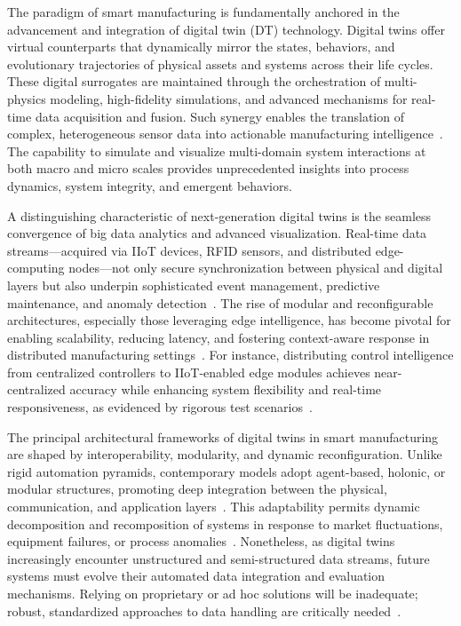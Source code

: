 \documentclass[sigconf]{acmart}
\begin{document}
The paradigm of smart manufacturing is fundamentally anchored in the advancement and integration of digital twin (DT) technology. Digital twins offer virtual counterparts that dynamically mirror the states, behaviors, and evolutionary trajectories of physical assets and systems across their life cycles. These digital surrogates are maintained through the orchestration of multi-physics modeling, high-fidelity simulations, and advanced mechanisms for real-time data acquisition and fusion. Such synergy enables the translation of complex, heterogeneous sensor data into actionable manufacturing intelligence~\cite{ref91}. The capability to simulate and visualize multi-domain system interactions at both macro and micro scales provides unprecedented insights into process dynamics, system integrity, and emergent behaviors.

A distinguishing characteristic of next-generation digital twins is the seamless convergence of big data analytics and advanced visualization. Real-time data streams---acquired via IIoT devices, RFID sensors, and distributed edge-computing nodes---not only secure synchronization between physical and digital layers but also underpin sophisticated event management, predictive maintenance, and anomaly detection~\cite{ref4,ref8,ref11,ref12,ref13,ref14,ref16,ref18,ref19,ref20,ref27,ref28,ref29,ref30,ref36,ref38,ref41,ref43,ref44,ref45,ref57,ref59,ref91}. The rise of modular and reconfigurable architectures, especially those leveraging edge intelligence, has become pivotal for enabling scalability, reducing latency, and fostering context-aware response in distributed manufacturing settings~\cite{ref91}. For instance, distributing control intelligence from centralized controllers to IIoT-enabled edge modules achieves near-centralized accuracy while enhancing system flexibility and real-time responsiveness, as evidenced by rigorous test scenarios~\cite{ref3}.

The principal architectural frameworks of digital twins in smart manufacturing are shaped by interoperability, modularity, and dynamic reconfiguration. Unlike rigid automation pyramids, contemporary models adopt agent-based, holonic, or modular structures, promoting deep integration between the physical, communication, and application layers~\cite{ref25}. This adaptability permits dynamic decomposition and recomposition of systems in response to market fluctuations, equipment failures, or process anomalies~\cite{ref3}. Nonetheless, as digital twins increasingly encounter unstructured and semi-structured data streams, future systems must evolve their automated data integration and evaluation mechanisms. Relying on proprietary or ad hoc solutions will be inadequate; robust, standardized approaches to data handling are critically needed~\cite{ref91}.
\end{document}

